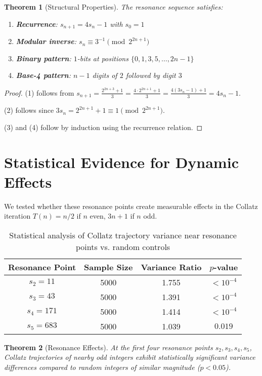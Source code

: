\documentclass[11pt]{article}
\newtheorem{theorem}{Theorem}
\theoremstyle{remark}
\begin{document}
\begin{theorem}[Structural Properties]
The resonance sequence satisfies:
\begin{enumerate}
\item \textbf{Recurrence}: $s_{n+1} = 4s_n - 1$ with $s_0 = 1$
\item \textbf{Modular inverse}: $s_n \equiv 3^{-1} \pmod{2^{2n+1}}$
\item \textbf{Binary pattern}: $1$-bits at positions $\{0, 1, 3, 5, \ldots, 2n-1\}$
\item \textbf{Base-4 pattern}: $n-1$ digits of $2$ followed by digit $3$
\end{enumerate}
\end{theorem}

\begin{proof}
(1) follows from $s_{n+1} = \frac{2^{2n+3} + 1}{3} = \frac{4 \cdot 2^{2n+1} + 1}{3} = \frac{4(3s_n - 1) + 1}{3} = 4s_n - 1$.

(2) follows since $3s_n = 2^{2n+1} + 1 \equiv 1 \pmod{2^{2n+1}}$.

(3) and (4) follow by induction using the recurrence relation.
\end{proof}

\section{Statistical Evidence for Dynamic Effects}

We tested whether these resonance points create measurable effects in the Collatz iteration $T(n) = n/2$ if $n$ even, $3n+1$ if $n$ odd.

\begin{table}[h]
\centering
\begin{tabular}{@{}cccc@{}}
\toprule
Resonance Point & Sample Size & Variance Ratio & $p$-value \\
\midrule
$s_2 = 11$ & 5000 & 1.755 & $<10^{-4}$ \\
$s_3 = 43$ & 5000 & 1.391 & $<10^{-4}$ \\
$s_4 = 171$ & 5000 & 1.414 & $<10^{-4}$ \\
$s_5 = 683$ & 5000 & 1.039 & $0.019$ \\
\bottomrule
\end{tabular}
\caption{Statistical analysis of Collatz trajectory variance near resonance points vs. random controls}
\end{table}

\begin{theorem}[Resonance Effects]
At the first four resonance points $s_2, s_3, s_4, s_5$, Collatz trajectories of nearby odd integers exhibit statistically significant variance differences compared to random integers of similar magnitude ($p < 0.05$).
\end{theorem}
\end{document}
